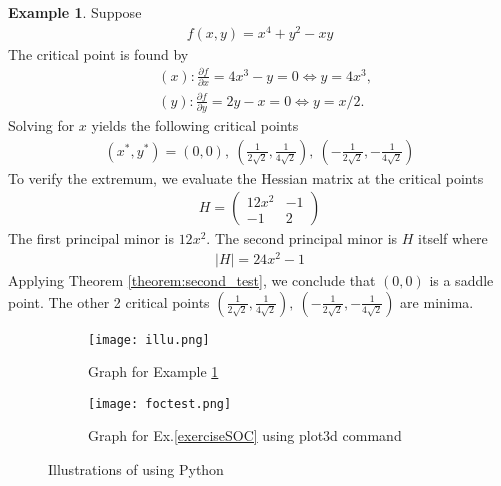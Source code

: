 \documentclass[10pt,a4paper]{book}
\theoremstyle{definition}\newtheorem{definition}{Definition}
\theoremstyle{definition}\newtheorem{fact}{Fact}
\theoremstyle{definition}\newtheorem{ex}{Ex.}
\theoremstyle{definition}\newtheorem{project}{Project}
\theoremstyle{definition}\newtheorem{problem}{Problem}
\theoremstyle{definition}\newtheorem{example}{Example}
\numberwithin{theorem}{chapter}
\numberwithin{corollary}{chapter}
\numberwithin{assumption}{chapter}
\numberwithin{definition}{chapter}
\numberwithin{prop}{chapter}
\numberwithin{notation}{chapter}
\numberwithin{problem}{chapter}
\numberwithin{example}{chapter}
\numberwithin{fact}{chapter}
\numberwithin{ex}{chapter}
\begin{document}
	\begin{example} \label{ex:soc2}
		Suppose
		\begin{align*}
			f(x,y) = x^4 + y^2 - xy 
		\end{align*}
		The critical point is found by
		\begin{align*}
			& (x): \frac{\partial f}{\partial x} = 4x^3 - y = 0 \iff y  = 4 x^3, \\
			& (y): \frac{\partial f}{\partial y} = 2y - x = 0 \iff y = x/2.      
		\end{align*}
		Solving for $x$ yields the following critical points
		\begin{align*}
			(x^*,y^*) = (0,0), \ (\frac{1}{2\sqrt{2}} , \frac{1}{4\sqrt{2}}  ), \ (-\frac{1}{2\sqrt{2}} , -\frac{1}{4\sqrt{2}}  ) 
		\end{align*}
		To verify the extremum, we evaluate the Hessian matrix at the critical points
		\begin{align*}
			H = \begin{pmatrix}
				12 x^2 & -1 \\
				-1     & 2  
			\end{pmatrix}
		\end{align*}
		The first principal minor is $12x^2$. The second principal minor is $H$ itself where
		\begin{align*}
			| H | = 24 x^2 - 1 
		\end{align*} 
		Applying Theorem \ref{theorem:second_test}, we conclude that $(0,0)$ is a saddle point. The other 2 critical points $(\frac{1}{2\sqrt{2}} , \frac{1}{4\sqrt{2}}  ), \ (-\frac{1}{2\sqrt{2}} , -\frac{1}{4\sqrt{2}}  )$ are minima.
	\end{example}
	
	\begin{figure}[h!]
\centering
\begin{subfigure}[b]{0.4\linewidth}
\texttt{[image: illu.png]}
\caption{Graph for Example \ref{ex:soc2}}
\end{subfigure}
\begin{subfigure}[b]{0.4\linewidth}
\texttt{[image: foctest.png]}
\caption{Graph for Ex.\ref{exerciseSOC} using plot3d command}
\end{subfigure}
\caption{Illustrations of using Python}
\end{figure}

	
\end{document}
